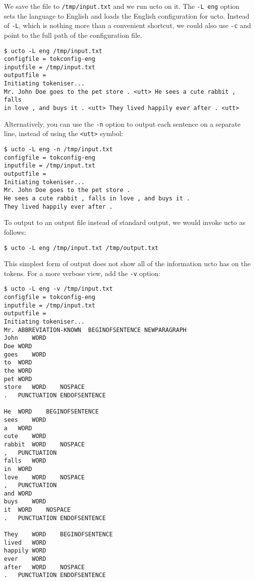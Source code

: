 \documentclass[a4paper,12pt]{report}
\begin{document}
We save the file to \texttt{/tmp/input.txt} and we run ucto on it. The
\texttt{-L eng} option sets the language to English and loads the English configuration for ucto. Instead of
\texttt{-L}, which is nothing more than a convenient shortcut, we could also use \texttt{-c} and point to the full path of the configuration file.

\begin{verbatim}
$ ucto -L eng /tmp/input.txt
configfile = tokconfig-eng
inputfile = /tmp/input.txt
outputfile =
Initiating tokeniser...
Mr. John Doe goes to the pet store . <utt> He sees a cute rabbit , falls
in love , and buys it . <utt> They lived happily ever after . <utt>
\end{verbatim}

Alternatively, you can use the \texttt{-n} option to output each sentence on a separate line, instead of using the \texttt{<utt>} symbol:

\begin{verbatim}
$ ucto -L eng -n /tmp/input.txt
configfile = tokconfig-eng
inputfile = /tmp/input.txt
outputfile =
Initiating tokeniser...
Mr. John Doe goes to the pet store .
He sees a cute rabbit , falls in love , and buys it .
They lived happily ever after .
\end{verbatim}

To output to an output file instead of standard output, we would invoke ucto as follows:

\begin{verbatim}
$ ucto -L eng /tmp/input.txt /tmp/output.txt
\end{verbatim}

This simplest form of output does not show all of the information ucto has on the tokens. For a more verbose view, add the \texttt{-v} option:

\begin{verbatim}
$ ucto -L eng -v /tmp/input.txt
configfile = tokconfig-eng
inputfile = /tmp/input.txt
outputfile =
Initiating tokeniser...
Mr.	ABBREVIATION-KNOWN	BEGINOFSENTENCE NEWPARAGRAPH
John	WORD
Doe	WORD
goes	WORD
to	WORD
the	WORD
pet	WORD
store	WORD	NOSPACE
.	PUNCTUATION	ENDOFSENTENCE

He	WORD	BEGINOFSENTENCE
sees	WORD
a	WORD
cute	WORD
rabbit	WORD	NOSPACE
,	PUNCTUATION
falls	WORD
in	WORD
love	WORD	NOSPACE
,	PUNCTUATION
and	WORD
buys	WORD
it	WORD	NOSPACE
.	PUNCTUATION	ENDOFSENTENCE

They	WORD	BEGINOFSENTENCE
lived	WORD
happily	WORD
ever	WORD
after	WORD	NOSPACE
.	PUNCTUATION	ENDOFSENTENCE
\end{verbatim}
\end{document}
